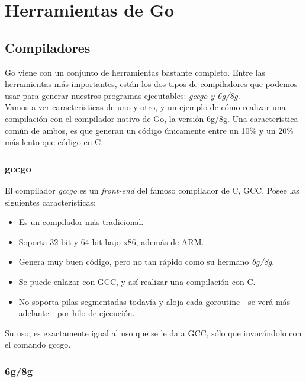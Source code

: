 \chapter{Herramientas de Go}

\section{Compiladores}

Go viene con un conjunto de herramientas bastante completo. Entre las
herramientas más importantes, están los dos tipos de compiladores que podemos
usar para generar nuestros programas ejecutables: \emph{gccgo y 6g/8g}.\\

Vamos a ver características de uno y otro, y un ejemplo de cómo realizar una
compilación con el compilador nativo de Go, la versión 6g/8g. Una característica
común de ambos, es que generan un código únicamente entre un 10\% y un 20\% más
lento que código en C.

	\subsection{gccgo}
	
	El compilador \emph{gccgo} es un \textit{front-end} del famoso compilador
	de C, GCC. Posee las siguientes características:
	
	\begin{itemize} \item Es un compilador más tradicional.  \item Soporta
	32-bit y 64-bit bajo x86, además de ARM.  \item Genera muy buen código, pero
	no tan rápido como su hermano \emph{6g/8g}.  \item Se puede enlazar con
	GCC, y así realizar una compilación con C.  \item No soporta pilas
	segmentadas todavía y aloja cada goroutine - se verá más adelante - por hilo
	de ejecución.  \end{itemize}
	
	Su uso, es exactamente igual al uso que se le da a GCC, sólo que invocándolo
	con el comando gccgo.
	
	\subsection{6g/8g}
	
